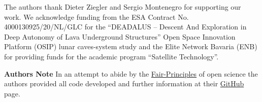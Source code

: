\documentclass[graybox,a4paper]{svmult}
\newcommand{\1}{\mathbbm{1}}                 %
\begin{document}










\begin{acknowledgement}
The authors thank Dieter Ziegler and Sergio Montenegro for supporting our work. We acknowledge funding from the ESA Contract No. 4000130925/20/NL/GLC for the ``DEADALUS -- Descent And Exploration in Deep Autonomy of Lava Underground Structures'' Open Space Innovation Platform (OSIP) lunar caves-system study and the Elite Network Bavaria (ENB) for providing funds for the academic program ``Satellite Technology''.

\bigskip

\noindent \textbf{Authors Note}
In an attempt to abide by the \href{https://www.go-fair.org/fair-principles}{Fair-Principles} of open science the authors provided all code developed and further information at their \href{https://github.com/fallow24/L.U.N.A}{GitHub} page.
\end{acknowledgement}



\end{document}
